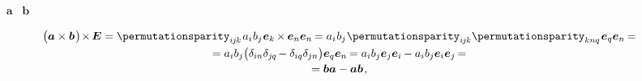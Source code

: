 \vspace{-0.15em}\noindent
{}~  ~$\bm{a}$ ~$\bm{b}$

\nopagebreak\vspace{-0.5em}
\begin{multline}\label{vectorcrossvectorcrossidentity}
\bigl( \bm{a} \times \bm{b} \hspace{.15ex}\bigr) \hspace{-0.33ex} \times \hspace{-0.22ex} \UnitDyad
= \permutationsparity_{i\hspace{-0.1ex}j\hspace{-0.1ex}k} \hspace{.2ex} a_i \hspace{.1ex} b_j \hspace{.1ex} \bm{e}_k \hspace{-0.15ex} \times \hspace{-0.1ex} \bm{e}_n \bm{e}_n \hspace{-0.2ex}
= a_i \hspace{.1ex} b_j \hspace{.1ex} \permutationsparity_{i\hspace{-0.1ex}j\hspace{-0.1ex}k} \permutationsparity_{knq} \hspace{.2ex} \bm{e}_q \bm{e}_n \hspace{-0.2ex} =
\\[-0.1em]
%
= a_i b_j \bigl( \delta_{in} \delta_{j\hspace{-0.1ex}q} \hspace{-0.22ex} - \delta_{iq} \delta_{jn} \bigr) \bm{e}_q \bm{e}_n \hspace{-0.2ex}
= a_i b_j \bm{e}_j \bm{e}_i \hspace{-0.12ex} - a_i b_j \bm{e}_i \bm{e}_j \hspace{-0.2ex} =
\\[-0.1em]
%
= \bm{b} \bm{a} - \bm{a} \bm{b}
\hspace{.2ex},
\end{multline}

